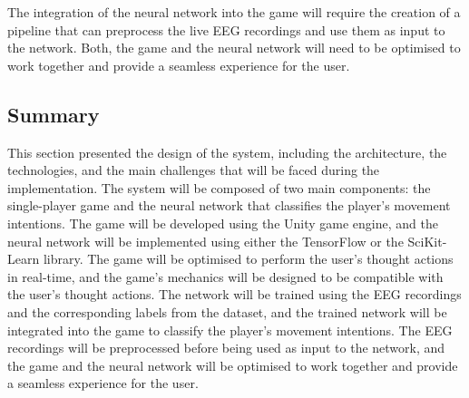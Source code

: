 The integration of the neural network into the game will require the creation of a pipeline that can preprocess the live EEG recordings and use them as input to the network.
Both, the game and the neural network will need to be optimised to work together and provide a seamless experience for the user.

\subsection{Summary}
This section presented the design of the system, including the architecture, the technologies, and the main challenges that will be faced during the implementation.
The system will be composed of two main components: the single-player game and the neural network that classifies the player's movement intentions.
The game will be developed using the Unity game engine, and the neural network will be implemented using either the TensorFlow or the SciKit-Learn library.
The game will be optimised to perform the user's thought actions in real-time, and the game's mechanics will be designed to be compatible with the user's thought actions.
The network will be trained using the EEG recordings and the corresponding labels from the dataset, and the trained network will be integrated into the game to classify the player's movement intentions.
The EEG recordings will be preprocessed before being used as input to the network, and the game and the neural network will be optimised to work together and provide a seamless experience for the user.
